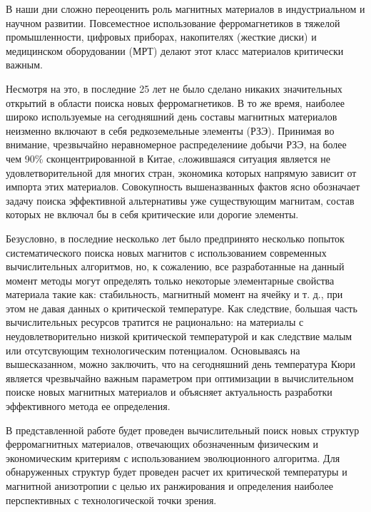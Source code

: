 В наши дни сложно переоценить роль магнитных материалов в индустриальном и научном развитии. Повсеместное использование ферромагнетиков в тяжелой промышленности, цифровых приборах, накопителях (жесткие диски) и медицинском оборудовании (МРТ) делают этот класс материалов критически важным.

Несмотря на это, в последние 25 лет не было сделано никаких значительных открытий в области поиска новых ферромагнетиков. В то же время, наиболее широко используемые на сегодняшний день составы магнитных материалов неизменно включают в себя редкоземельные элементы (РЗЭ).  Принимая во внимание, чрезвычайно неравномерное распределениие добычи РЗЭ,  на более чем 90\% сконцентрированной в Китае, cложившаяся ситуация является не удовлетворительной для многих стран, экономика которых напрямую зависит от импорта этих материалов.
Совокупность вышеназванных фактов ясно обозначает задачу поиска эффективной альтернативы уже существующим магнитам, состав которых не включал бы в себя критические или дорогие элементы.

Безусловно, в последние несколько лет было предпринято несколько попыток систематического поиска новых магнитов с использованием современных вычислительных алгоритмов, но, к сожалению, все разработанные на данный момент методы могут определять только некоторые элементарные свойства материала такие как: стабильность, магнитный момент на ячейку и т. д., при этом не давая данных о критической температуре.  Как следствие, большая часть вычислительных ресурсов тратится не рационально: на материалы с неудовлетворительно низкой критической температурой и как следствие малым или отсутсвующим технологическим потенциалом. Основываясь на вышесказанном, можно заключить, что на сегодняшний день температура Кюри является чрезвычайно важным параметром при оптимизации в вычислительном поиске новых магнитных материалов и объясняет актуальность разработки эффективного метода ее определения.

В представленной работе будет проведен вычислительный поиск новых структур ферромагнитных материалов, отвечающих обозначенным физическим и экономическим критериям с использованием эволюционного алгоритма. Для обнаруженных структур будет проведен расчет их критической температуры и магнитной анизотропии с целью их ранжирования и определения наиболее перспективных с технологической точки зрения. 

